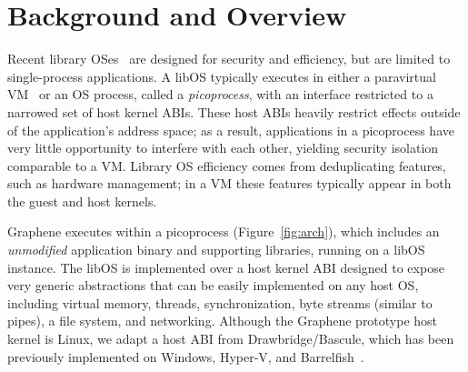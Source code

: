 \section{Background and Overview}
\label{sec:background}

Recent library OSes~\cite{porter11drawbridge,unikernels,baumann13bascule,osv}
are designed for security and efficiency, but are limited to single-process applications.
A libOS typically executes in either a paravirtual VM~\cite{unikernels,osv}
or an OS process, called a {\em picoprocess},
with an interface restricted to a narrowed set of host kernel ABIs.
These host ABIs heavily restrict effects outside of the application's address space;
as a result, applications in a picoprocess have very little opportunity to interfere with each other,
yielding security isolation comparable to a VM.
Library OS efficiency comes from deduplicating features, such as hardware management;
in a VM these features typically appear in both the guest and host kernels.


Graphene executes within a picoprocess (Figure~\ref{fig:arch}),
which includes an {\em unmodified} application binary and supporting libraries, 
running on a libOS instance.
The libOS is implemented over a host kernel ABI
designed to expose very generic abstractions that can be easily 
implemented on any host OS, including virtual memory, threads, synchronization, byte streams (similar to pipes),
a file system, and networking.
Although the Graphene prototype  host kernel is Linux, 
we adapt a host ABI from Drawbridge/Bascule,
which has been previously implemented on Windows, Hyper-V, and Barrelfish~\cite{porter11drawbridge,baumann13bascule,baumann09barrelfish}.


